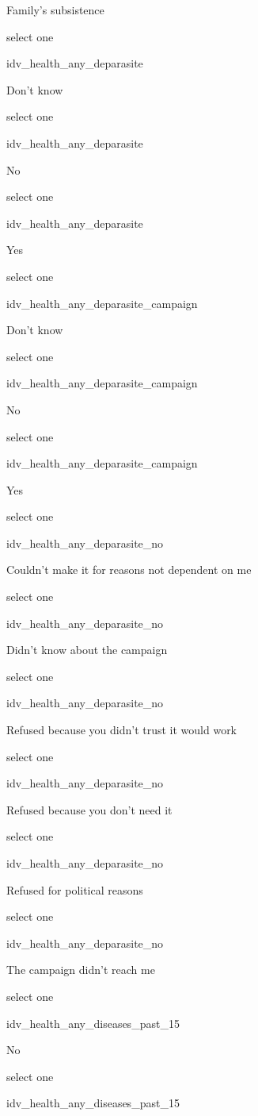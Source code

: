 \documentclass[]{article}
\begin{document}
Family's subsistence

select one

idv\_health\_any\_deparasite

Don't know

select one

idv\_health\_any\_deparasite

No

select one

idv\_health\_any\_deparasite

Yes

select one

idv\_health\_any\_deparasite\_campaign

Don't know

select one

idv\_health\_any\_deparasite\_campaign

No

select one

idv\_health\_any\_deparasite\_campaign

Yes

select one

idv\_health\_any\_deparasite\_no

Couldn't make it for reasons not dependent on me

select one

idv\_health\_any\_deparasite\_no

Didn't know about the campaign

select one

idv\_health\_any\_deparasite\_no

Refused because you didn't trust it would work

select one

idv\_health\_any\_deparasite\_no

Refused because you don't need it

select one

idv\_health\_any\_deparasite\_no

Refused for political reasons

select one

idv\_health\_any\_deparasite\_no

The campaign didn't reach me

select one

idv\_health\_any\_diseases\_past\_15

No

select one

idv\_health\_any\_diseases\_past\_15
\end{document}
